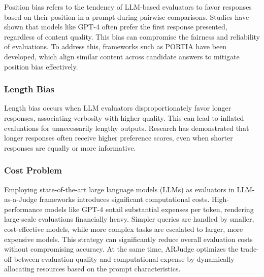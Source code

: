 \documentclass[sigconf, authoryear]{acmart}
\begin{document}
Position bias refers to the tendency of LLM-based evaluators to favor responses based on their position in a prompt during pairwise comparisons.
Studies have shown that models like GPT-4 often prefer the first response presented, regardless of content quality\cite{shi2024judging}.
This bias can compromise the fairness and reliability of evaluations.
To address this, frameworks such as PORTIA have been developed, which align similar content across candidate answers to mitigate position bias effectively\cite{li-etal-2024-split}.

\subsubsection{Length Bias}

Length bias occurs when LLM evaluators disproportionately favor longer responses, associating verbosity with higher quality.
This can lead to inflated evaluations for unnecessarily lengthy outputs.
Research has demonstrated that longer responses often receive higher preference scores, even when shorter responses are equally or more informative\cite{hu2024explaining}.

\subsubsection{Cost Problem}

Employing state-of-the-art large language models (LLMs) as evaluators in LLM-as-a-Judge frameworks introduces significant computational costs.
High-performance models like GPT-4 entail substantial expenses per token, rendering large-scale evaluations financially heavy.
Simpler queries are handled by smaller, cost-effective models, while more complex tasks are escalated to larger, more expensive models.
This strategy can significantly reduce overall evaluation costs without compromising accuracy\cite{chen2023frugalgpt}.
At the same time, ARJudge optimizes the trade-off between evaluation quality and computational expense by dynamically allocating resources based on the prompt characteristics\cite{ar_judge}.




\end{document}
